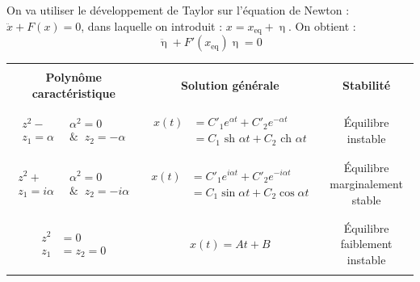 \documentclass[a4paper]{article}
\begin{document}
\begin{tcolorbox}[title=\textcolor{black}{H. Étude de la stabilité - Méthode des perturbations infinitésimales}, colback=white, colframe=cyan!50, sharp corners]

On va utiliser le développement de Taylor sur l'équation de Newton : $ \ddot{x} + F(x) = 0 $, dans laquelle on introduit : $ x = x_{\text{eq}} + \upeta $. On obtient : \[ \ddot{\upeta} + F'(x_{\text{eq}}) \upeta = 0 \]

\begin{center} \begin{tabular}{|c|c|c|}
\hline &&\\
\textbf{Polynôme caractéristique} & \textbf{Solution générale} & \textbf{Stabilité} \\ && \\
\hline && \\
$ \begin{aligned} z^2 - &\alpha^2 = 0 \\ z_1 = \alpha \; \; &\& \; \; z_2 = - \alpha \end{aligned} $ & $ \begin{aligned} x(t) &= C'_1 e^{\alpha t} + C'_2 e^{- \alpha t} \\ &= C_1 \text{ sh } \alpha t + C_2 \text{ ch } \alpha t \end{aligned} $ & Équilibre instable \\&& \\\hline&& \\
$ \begin{aligned} z^2 + &\alpha^2 = 0 \\ z_1 = i \alpha \; \; &\& \; \; z_2 = - i \alpha \end{aligned} $ & $ \begin{aligned} x(t) &= C'_1 e^{i \alpha t} + C'_2 e^{- i \alpha t} \\ &= C_1 \sin \alpha t + C_2 \cos \alpha t \end{aligned} $ & Équilibre marginalement stable \\&& \\\hline&& \\
$ \begin{aligned} z^2 &= 0 \\ z_1 &= z_2 = 0 \end{aligned} $ & $ x(t) = A t + B $ & Équilibre faiblement instable \\ && \\
\hline
\end{tabular} \end{center}

\end{tcolorbox}
\end{document}
